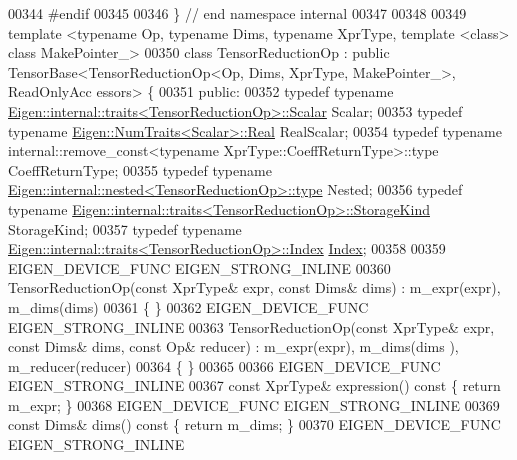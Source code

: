 \begin{DoxyCode}
00344 \textcolor{preprocessor}{#endif}
00345 
00346 \}  \textcolor{comment}{// end namespace internal}
00347 
00348 
00349 \textcolor{keyword}{template} <\textcolor{keyword}{typename} Op, \textcolor{keyword}{typename} Dims, \textcolor{keyword}{typename} XprType,  \textcolor{keyword}{template} <\textcolor{keyword}{class}> \textcolor{keyword}{class }MakePointer\_>
00350 \textcolor{keyword}{class }TensorReductionOp : \textcolor{keyword}{public} TensorBase<TensorReductionOp<Op, Dims, XprType, MakePointer\_>, ReadOnlyAcc
      essors> \{
00351   \textcolor{keyword}{public}:
00352     \textcolor{keyword}{typedef} \textcolor{keyword}{typename} \hyperlink{struct_eigen_1_1internal_1_1traits}{Eigen::internal::traits<TensorReductionOp>::Scalar}
       Scalar;
00353     \textcolor{keyword}{typedef} \textcolor{keyword}{typename} \hyperlink{group___sparse_core___module}{Eigen::NumTraits<Scalar>::Real} RealScalar;
00354     \textcolor{keyword}{typedef} \textcolor{keyword}{typename} internal::remove\_const<typename XprType::CoeffReturnType>::type CoeffReturnType;
00355     \textcolor{keyword}{typedef} \textcolor{keyword}{typename} \hyperlink{class_eigen_1_1internal_1_1_tensor_lazy_evaluator_writable}{Eigen::internal::nested<TensorReductionOp>::type}
       Nested;
00356     \textcolor{keyword}{typedef} \textcolor{keyword}{typename} \hyperlink{struct_eigen_1_1internal_1_1traits}{Eigen::internal::traits<TensorReductionOp>::StorageKind}
       StorageKind;
00357     \textcolor{keyword}{typedef} \textcolor{keyword}{typename} \hyperlink{struct_eigen_1_1internal_1_1traits}{Eigen::internal::traits<TensorReductionOp>::Index}
       \hyperlink{namespace_eigen_a62e77e0933482dafde8fe197d9a2cfde}{Index};
00358 
00359     EIGEN\_DEVICE\_FUNC EIGEN\_STRONG\_INLINE
00360     TensorReductionOp(\textcolor{keyword}{const} XprType& expr, \textcolor{keyword}{const} Dims& dims) : m\_expr(expr), m\_dims(dims)
00361     \{ \}
00362     EIGEN\_DEVICE\_FUNC EIGEN\_STRONG\_INLINE
00363     TensorReductionOp(\textcolor{keyword}{const} XprType& expr, \textcolor{keyword}{const} Dims& dims, \textcolor{keyword}{const} Op& reducer) : m\_expr(expr), m\_dims(dims
      ), m\_reducer(reducer)
00364     \{ \}
00365 
00366     EIGEN\_DEVICE\_FUNC EIGEN\_STRONG\_INLINE
00367     \textcolor{keyword}{const} XprType& expression()\textcolor{keyword}{ const }\{ \textcolor{keywordflow}{return} m\_expr; \}
00368     EIGEN\_DEVICE\_FUNC EIGEN\_STRONG\_INLINE
00369     \textcolor{keyword}{const} Dims& dims()\textcolor{keyword}{ const }\{ \textcolor{keywordflow}{return} m\_dims; \}
00370     EIGEN\_DEVICE\_FUNC EIGEN\_STRONG\_INLINE

\end{DoxyCode}
